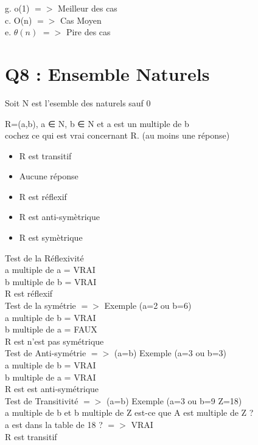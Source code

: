 \vspace{5mm} %

g. o(1) $=>$ Meilleur des cas \\

c. O(n) $=>$ Cas Moyen \\

e. $\theta(n)$ $=>$ Pire des cas \\



\newpage
\section{Q8 : Ensemble Naturels}
\vspace{5mm} %

Soit N est l’esemble des naturels sauf 0

  R={(a,b), a ∈ N, b ∈ N et a est un multiple de b }\\


cochez ce qui est vrai concernant R. (au moins une réponse)\\
\begin{itemize}[label=$\square$]
\item R est transitif
\item Aucune réponse
\item R est réflexif
\item R est anti-symètrique
\item R est symètrique
\end{itemize}

\vspace{5mm} %

Test de la Réflexivité \\

a multiple de a = VRAI \\
b multiple de b = VRAI \\
R est réflexif \\

Test de la symétrie $=>$ Exemple (a=2 ou b=6) \\

a multiple de b = VRAI \\
b multiple de a = FAUX \\
R est n'est pas symétrique \\


Test de Anti-symétrie $=>$ (a=b) Exemple (a=3 ou b=3) \\

a multiple de b = VRAI \\
b multiple de a = VRAI \\
R est est anti-symétrique \\


Test de Transitivité $=>$ (a=b) Exemple (a=3 ou b=9 Z=18) \\

a multiple de b et b multiple de Z est-ce que A est multiple de Z ? \\
a est dans la table de 18 ?  $=>$ VRAI \\
R est transitif \\
